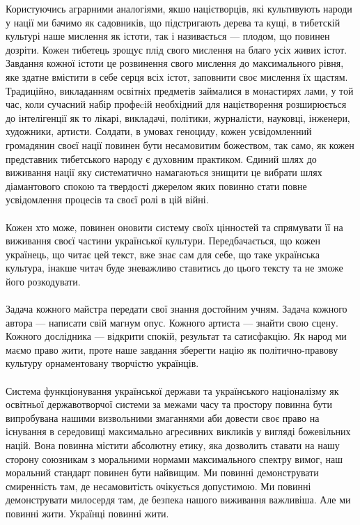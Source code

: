 Користуючись аграрними аналогіями, якшо націєтворців, які культивують народи у нації ми бачимо як садовників, що підстригають дерева та кущі, в тибетскій культурі наше мислення як істоти, так і називається — плодом, що повинен дозріти. Кожен тибетець зрощує плід свого мислення на благо усіх живих істот. Завдання кожної істоти це розвинення свого мислення до максимального рівня, яке здатне вмістити в себе серця всіх істот, заповнити своє мислення їх щастям. Традиційно, викладанням освітніх предметів займалися в монастирях лами, у той час, коли сучасний набір профеcій необхідний для націєтворення розширюється до інтелігенції як то лікарі, викладачі, політики, журналісти, науковці, інженери, художники, артисти. Солдати, в умовах геноциду, кожен усвідомленний громадянин своєї нації повинен бути несамовитим божеством, так само, як кожен представник тибетського народу є духовним практиком. Єдиний шлях до виживання нації яку систематично намагаються знищити це вибрати шлях діамантового спокою та твердості джерелом яких повинно стати повне усвідомлення процесів та своєї ролі в цій війні.
\\
\\
Кожен хто може, повинен оновити систему своїх цінностей та спрямувати її на виживання своєї частини української культури. Передбачається, що кожен українець, що читає цей текст, вже знає сам для себе, що таке українська культура, інакше читач буде зневажливо ставитись до цього тексту та не зможе його розкодувати.
\\
\\
Задача кожного майстра передати свої знання достойним учням. Задача кожного автора — написати свій магнум опус. Кожного артиста — знайти свою сцену. Кожного дослідника — відкрити спокій, результат та сатисфакцію. Як народ ми маємо право жити, проте наше завдання зберегти націю як політично-правову культуру орнаментовану творчістю українців.
\\
\\
Система функціонування української держави та українського націоналізму як освітньої державотворчої системи за межами часу та простору повинна бути випробувана нашими визвольними змаганнями аби довести своє право на існування в середовищі максимально агресивних викликів у вигляді божевільних націй. Вона повинна містити абсолютну етику, яка дозволить ставати на нашу сторону союзникам з моральними нормами максимального спектру вимог, наш моральний стандарт повинен бути найвищим. Ми повинні демонструвати смиренність там, де несамовитість очікується допустимою. Ми повинні демонструвати милосердя там, де безпека нашого виживання важливіша. Але ми повинні жити. Українці повинні жити.



\normalsize
